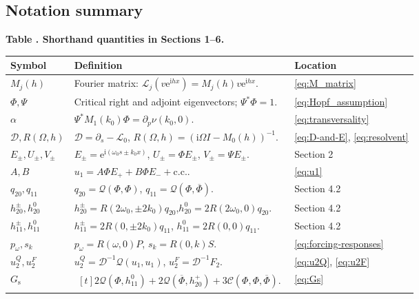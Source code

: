 \documentclass[11pt]{article}
\newcommand{\ii}{\mathrm{i}}
\newcommand{\ee}{\mathrm{e}}
\newcommand{\cQ}{\mathcal{Q}}
\newcommand{\cC}{\mathcal{C}}
\newcommand{\cL}{\mathcal{L}}
\newcommand{\cD}{\mathcal{D}}
\newcommand{\cc}{\mathrm{c.c.}}
\begin{document}
\noindent\begin{minipage}{\textwidth}
\subsection{Notation summary}
\begingroup
\small
\setlength{\tabcolsep}{3pt}
\renewcommand{\arraystretch}{1.12}
\label{tab:amplitude-notation}
\noindent\textbf{Table \thetable. Shorthand quantities in Sections 1--6.}
\par\smallskip
\noindent
\begin{tabular}{@{}p{}p{}p{}@{}}
\toprule
Symbol & Definition & Location \\
\midrule
$M_j(h)$ & Fourier matrix: $\cL_j(v\ee^{\ii hx})=M_j(h)v\ee^{\ii hx}$. & \eqref{eq:M_matrix} \\
$\Phi,\Psi$ & Critical right and adjoint eigenvectors; $\Psi^*\Phi=1$. & \eqref{eq:Hopf_assumption} \\
$\alpha$ & $\Psi^*M_1(k_0)\Phi=\partial_p\nu(k_0,0)$. & \eqref{eq:transversality} \\
$\cD, R(\Omega,h)$ & $\cD=\partial_s-\cL_0$, $R(\Omega,h)=(\ii\Omega I-M_0(h))^{-1}$. & \eqref{eq:D-and-E}, \eqref{eq:resolvent} \\
$E_\pm,U_\pm,V_\pm$ & $E_\pm=\ee^{\ii(\omega_0s\pm k_0x)}$, $U_\pm=\Phi E_\pm$, $V_\pm=\Psi E_\pm$. & Section 2 \\
$A,B$ & $u_1=A\Phi E_++B\Phi E_-+\cc$. & \eqref{eq:u1} \\
$q_{20},q_{11}$ & $q_{20}=\cQ(\Phi,\Phi)$, $q_{11}=\cQ(\Phi,\overline\Phi)$. & Section 4.2 \\
$h_{20}^\pm,h_{20}^0$ & $h_{20}^\pm=R(2\omega_0,\pm2k_0)q_{20}$,\newline $h_{20}^0=2R(2\omega_0,0)q_{20}$. & Section 4.2 \\
$h_{11}^\pm,h_{11}^0$ & $h_{11}^\pm=2R(0,\pm2k_0)q_{11}$, $h_{11}^0=2R(0,0)q_{11}$. & Section 4.2 \\
$p_\omega,s_k$ & $p_\omega=R(\omega,0)P$, $s_k=R(0,k)S$. & \eqref{eq:forcing-responses} \\
$u_2^Q,u_2^F$ & $u_2^Q=\cD^{-1}\cQ(u_1,u_1)$, $u_2^F=\cD^{-1}F_2$. & \eqref{eq:u2Q}, \eqref{eq:u2F} \\
$G_{\mathrm{s}}$ & $\begin{aligned}[t]2\cQ(\Phi,h_{11}^0)+2\cQ(\overline\Phi,h_{20}^+)
+3\cC(\Phi,\Phi,\overline\Phi).\end{aligned}$ & \eqref{eq:Gs} \\

\end{tabular}
\end{minipage}
\end{document}
